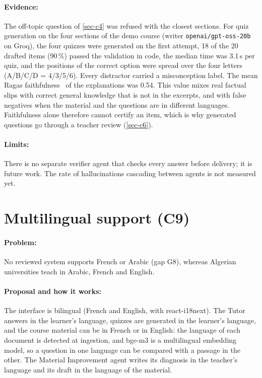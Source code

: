 \paragraph{Evidence:} The off-topic question of \cref{sec-c4} was refused
with the closest sections. For quiz generation on the four sections of
the demo course (writer \texttt{openai/gpt-oss-20b} on Groq), the four
quizzes were generated on the first attempt, 18 of the 20 drafted items
(90\,\%) passed the validation in code, the median time was 3.1\,s per
quiz, and the positions of the correct option were spread over the four
letters (A/B/C/D = 4/3/5/6). Every distractor carried a misconception label. The
mean Ragas faithfulness~\cite{es2024ragas} of the explanations was 0.54.
This value mixes real factual slips with correct general knowledge that
is not in the excerpts, and with false negatives when the material and
the questions are in different languages. Faithfulness alone therefore
cannot certify an item, which is why generated questions go through a
teacher review (\cref{sec-c6}).

\paragraph{Limits:} There is no separate verifier agent that checks every
answer before delivery; it is future work. The rate of hallucinations
cascading between agents is not measured yet.

\section[Multilingual support]{Multilingual support (C9)}
\label{sec-c9}

\paragraph{Problem:} No reviewed system supports French or Arabic
(gap G8), whereas Algerian universities teach in Arabic, French and
English.

\paragraph{Proposal and how it works:} The interface is bilingual
(French and English, with react-i18next). The Tutor answers in the
learner's language, quizzes are generated in the learner's language, and
the course material can be in French or in English: the language of each
document is detected at ingestion, and bge-m3 is a multilingual embedding
model, so a question in one language can be compared with a passage in the
other.
The Material Improvement agent writes its diagnosis in the teacher's
language and its draft in the language of the material.

